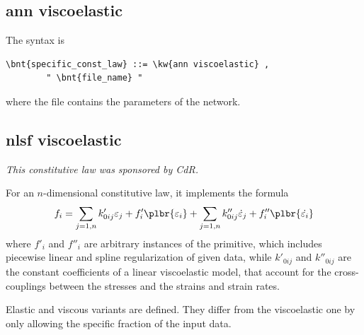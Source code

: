 \subsection{ann viscoelastic}\label{sec:CL:ANN-VISCOELASTIC}
The syntax is
\begin{Verbatim}[commandchars=\\\{\}]
    \bnt{specific_const_law} ::= \kw{ann viscoelastic} ,
        " \bnt{file_name} "
\end{Verbatim}
where the file  contains the parameters of the network.

\subsection{nlsf viscoelastic}
\emph{This constitutive law was sponsored
by  CdR.}
\bigskip

For an $n$-dimensional constitutive law, it implements the formula
\begin{equation}
        f_i
        = \sum_{j=1,n} k'_{0ij} \varepsilon_j
        + f'_i\plbr{\varepsilon_i}
        + \sum_{j=1,n} k''_{0ij} \dot{\varepsilon}_j
        + f''_i\plbr{\dot{\varepsilon_i}}
        \label{eq:nlsf-cl}
\end{equation}
where $f'_i$ and $f''_i$ are arbitrary instances
of the  primitive,
which includes piecewise linear and spline regularization
of given data, while $k'_{0ij}$ and $k''_{0ij}$ are the constant
coefficients of a linear viscoelastic model, that account
for the cross-couplings between the stresses 
and the strains and strain rates.

Elastic and viscous variants are defined.
They differ from the viscoelastic one by only allowing
the specific fraction of the input data.

